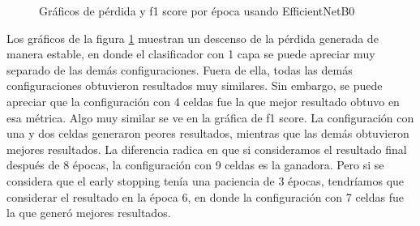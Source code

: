 \begin{figure}[h!]
    \centering
    \hfill
    \caption{Gráficos de pérdida y f1 score por época usando EfficientNetB0}
    \label{fig:combinedEfficientnetB0}
\end{figure}

Los gráficos de la figura \ref{fig:combinedEfficientnetB0} muestran 
un descenso de la pérdida generada de manera estable, en donde el 
clasificador con 1 capa se puede apreciar muy separado de las demás 
configuraciones. Fuera de ella, todas las demás configuraciones obtuvieron 
resultados muy similares. Sin embargo, se puede apreciar que la 
configuración con 4 celdas fue la que mejor resultado obtuvo en esa 
métrica. Algo muy similar se ve en la gráfica de f1 score. La configuración 
con una y dos celdas generaron peores resultados, mientras que las demás 
obtuvieron mejores resultados. La diferencia radica en que si consideramos 
el resultado final después de 8 épocas, la configuración con 9 celdas 
es la ganadora. Pero si se considera que el early stopping tenía una paciencia de 
3 épocas, tendríamos que considerar el resultado en la época 6, en donde la 
configuración con 7 celdas fue la que generó mejores resultados. 

